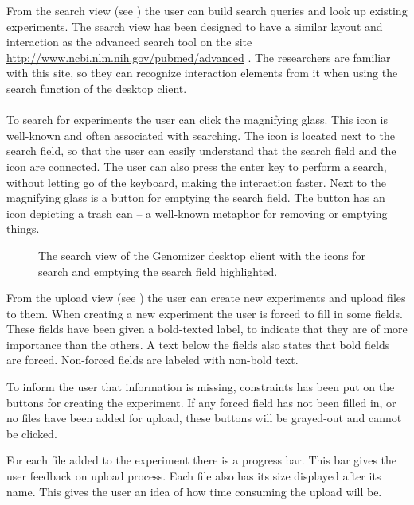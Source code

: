 From the search view (see ) the user can build search queries and look up existing experiments. The search view has been designed to have a similar layout and interaction as the advanced search tool on the site \\ \href{http://www.ncbi.nlm.nih.gov/pubmed/advanced}{http://www.ncbi.nlm.nih.gov/pubmed/advanced}
. The researchers are familiar with this site, so they can recognize interaction elements from it when using the search function of the desktop client.
\\\\
To search for experiments the user can click the magnifying glass. This icon is well-known and often associated with searching. The icon is located next to the search field, so that the user can easily understand that the search field and the icon are connected. The user can also press the enter key to perform a search, without letting go of the keyboard, making the interaction faster. Next to the magnifying glass is a button for emptying the search field. The button has an icon depicting a trash can -- a well-known metaphor for removing or emptying things.

\begin{figure}[h!]
	\caption{The search view of the Genomizer desktop client with the icons for search and emptying the search field highlighted.}
	\label{fig:des_search_tab_interaction}
\end{figure}

From the upload view (see ) the user can create new experiments and upload files to them. When creating a new experiment the user is forced to fill in some fields. These fields have been given a bold-texted label, to indicate that they are of more importance than the others. A text below the fields also states that bold fields are forced. Non-forced fields are labeled with non-bold text.

To inform the user that information is missing, constraints has been put on the buttons for creating the experiment. If any forced field has not been filled in, or no files have been added for upload, these buttons will be grayed-out and cannot be clicked.

For each file added to the experiment there is a progress bar. This bar gives the user feedback on upload process. Each file also has  its size displayed after its name. This gives the user an idea of how time consuming the upload will be.

